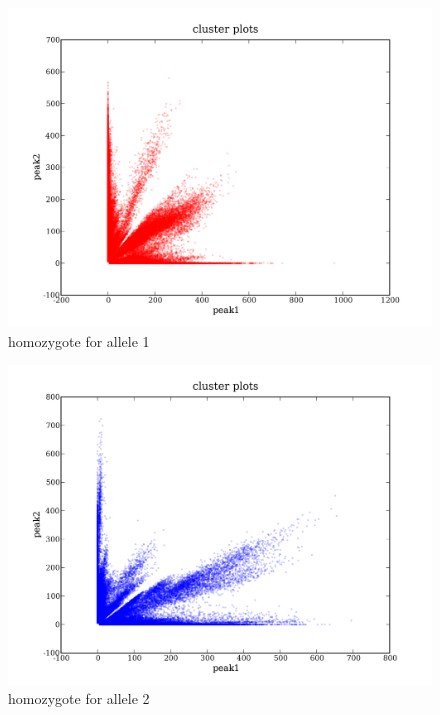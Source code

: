 \documentclass[a4paper,10pt]{article}
\begin{document}
\begin{figure}
\includegraphics[width=1\textwidth]{figures/cluster_plots_allele1.png}
\caption{homozygote for allele 1}\label{f1}
\end{figure}

\begin{figure}
\includegraphics[width=1\textwidth]{figures/cluster_plots_allele2.png}
\caption{homozygote for allele 2}\label{f2}
\end{figure}
\end{document}
